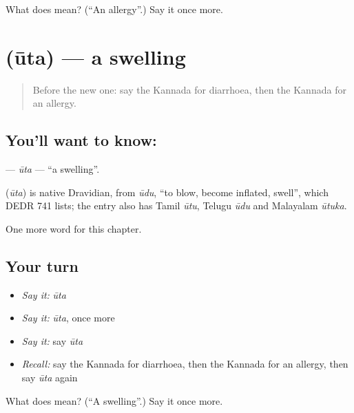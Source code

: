 \begin{tcolorbox}[breakable,colback=teal!4,colframe=teal!35!black,title={Before you move on}]
What does  mean? (\textquotedblleft{}An allergy\textquotedblright{}.) Say it once more.
\end{tcolorbox}
\section[\texorpdfstring{\kn{ಊತ} (ūta)}{ಊತ (ūta)}]{ (ūta) — a swelling}

\label{lesson:KA-C245-uta}



\begin{quote}
Before the new one: say the Kannada for diarrhoea, then the Kannada for an allergy.
\end{quote}

\subsection*{You'll want to know: }
\textbf{} — \emph{ūta} — \textquotedblleft{}a swelling\textquotedblright{}.

\begin{cousinweb}
\textbf{} (\emph{ūta}) is native Dravidian, from \emph{ūdu}, \textquotedblleft{}to blow, become inflated, swell\textquotedblright{}, which DEDR 741 lists; the entry also has Tamil \emph{ūtu}, Telugu \emph{ūdu} and Malayalam \emph{ūtuka}.
\end{cousinweb}

\begin{grammarlens}[title={What you've built}]
One more word for this chapter.
\end{grammarlens}

\subsection*{Your turn}
\begin{itemize}
\raggedright
  \item \emph{Say it:} \emph{ūta}
  \item \emph{Say it:} \emph{ūta}, once more
  \item \emph{Say it:} say \emph{ūta}
  \item \emph{Recall:} say the Kannada for diarrhoea, then the Kannada for an allergy, then say \emph{ūta} again
\end{itemize}

\begin{tcolorbox}[breakable,colback=teal!4,colframe=teal!35!black,title={Before you move on}]
What does  mean? (\textquotedblleft{}A swelling\textquotedblright{}.) Say it once more.
\end{tcolorbox}
